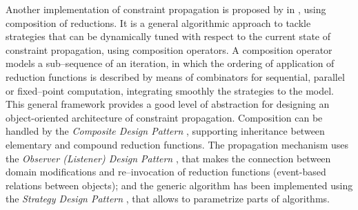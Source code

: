 Another implementation of constraint propagation is proposed by  in \cite{Granvilliers2001}, using composition of reductions. It is a general algorithmic approach to tackle strategies that can be dynamically tuned with respect to the current state of constraint propagation, using composition operators. A composition operator models a sub--sequence of an iteration, in which the ordering of application of reduction functions is described by means of combinators for sequential, parallel or fixed--point computation, integrating smoothly the strategies to the model. This general framework provides a good level of abstraction for designing an object-oriented architecture of constraint propagation. Composition can be handled by the {\it Composite Design Pattern} \cite{DP_Composite}, supporting inheritance between elementary and compound reduction functions. The propagation mechanism uses the {\it Observer (Listener) Design Pattern} \cite{DP_Observer}, that makes the connection between domain modifications and re--invocation of reduction functions (event-based relations between objects); and the generic algorithm has been implemented using the {\it Strategy Design Pattern} \cite{DP_Strategy}, that allows to parametrize parts of algorithms.

